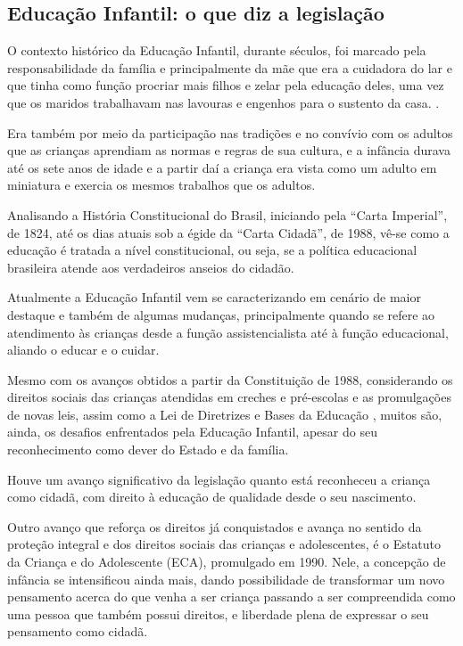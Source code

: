 \begin{refsection}
 

    \section{Educação Infantil: o que diz a legislação}

    O contexto histórico da Educação Infantil, durante séculos, foi marcado pela responsabilidade da família e principalmente da mãe que era a cuidadora do lar e que tinha como função procriar mais filhos e zelar pela educação deles, uma vez que os maridos trabalhavam nas lavouras e engenhos para o sustento da casa. \cite{OLIVEIRA2002Educação}. 

    Era também por meio da participação nas tradições e no convívio com os adultos que as crianças aprendiam as normas e regras de sua cultura, e a infância durava até os sete anos de idade e a partir daí a criança era vista como um adulto em miniatura e exercia os mesmos trabalhos que os adultos. 

    Analisando a História Constitucional do Brasil, iniciando pela “Carta Imperial”, de 1824, até os dias atuais sob a égide da “Carta Cidadã”, de 1988, vê-se como a educação é tratada a nível constitucional, ou seja, se a política educacional brasileira atende aos verdadeiros anseios do cidadão. 

    Atualmente a Educação Infantil vem se caracterizando em cenário de maior destaque e também de algumas mudanças, principalmente quando se refere ao atendimento às crianças desde a função assistencialista até à função educacional, aliando o educar e o cuidar. 

    Mesmo com os avanços obtidos a partir da Constituição de 1988, considerando os direitos sociais das crianças atendidas em creches e pré-escolas e as promulgações de novas leis, assim como a Lei de Diretrizes e Bases da Educação \citeyear{LDB1996}, muitos são, ainda, os desafios enfrentados pela Educação Infantil, apesar do seu reconhecimento como dever do Estado e da família. 

    Houve um avanço significativo da legislação quanto está reconheceu a criança como cidadã, com direito à educação de qualidade desde o seu nascimento. 

    Outro avanço que reforça os direitos já conquistados e avança no sentido da proteção integral e dos direitos sociais das crianças e adolescentes, é o Estatuto da Criança e do Adolescente (ECA), promulgado em 1990. Nele, a concepção de infância se intensificou ainda mais, dando possibilidade de transformar um novo pensamento acerca do que venha a ser criança passando a ser compreendida como uma pessoa que também possui direitos, e liberdade plena de expressar o seu pensamento como cidadã. 


\end{refsection}
